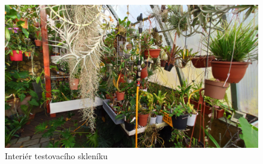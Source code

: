 \begin{figure}[htbp]
    \centering
    \includegraphics[width=\textwidth]{img/PHOTOS/OrchidHouse_INTERIOR.jpg}
    \caption{Interiér testovacího skleníku}
    \label{fig:OrchidHouse_INTERIORs}
\end{figure}
\newpage
